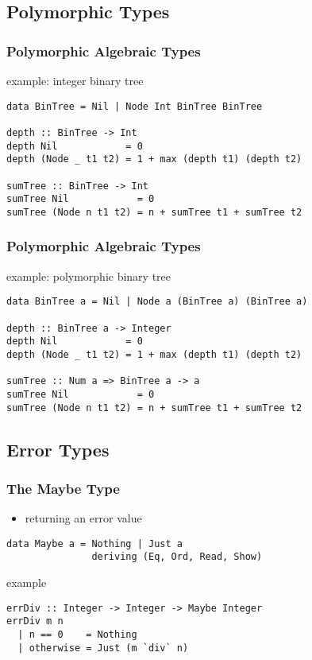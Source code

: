 \documentclass[dvipsnames]{beamer}
\theoremstyle{plain}
\begin{document}
\subsection{Polymorphic Types}

\begin{frame}[fragile]
  \frametitle{Polymorphic Algebraic Types}

  \begin{exampleblock}{example: integer binary tree}
    \begin{lstlisting}
data BinTree = Nil | Node Int BinTree BinTree

depth :: BinTree -> Int
depth Nil            = 0
depth (Node _ t1 t2) = 1 + max (depth t1) (depth t2)

sumTree :: BinTree -> Int
sumTree Nil            = 0
sumTree (Node n t1 t2) = n + sumTree t1 + sumTree t2
    \end{lstlisting}
  \end{exampleblock}
\end{frame}

\begin{frame}[fragile]
  \frametitle{Polymorphic Algebraic Types}

  \begin{exampleblock}{example: polymorphic binary tree}
    \begin{lstlisting}
data BinTree a = Nil | Node a (BinTree a) (BinTree a)

depth :: BinTree a -> Integer
depth Nil            = 0
depth (Node _ t1 t2) = 1 + max (depth t1) (depth t2)

sumTree :: Num a => BinTree a -> a
sumTree Nil            = 0
sumTree (Node n t1 t2) = n + sumTree t1 + sumTree t2
    \end{lstlisting}
  \end{exampleblock}
\end{frame}

\subsection{Error Types}

\begin{frame}[fragile]
  \frametitle{The Maybe Type}

  \begin{itemize}
    \item returning an error value
  \end{itemize}

  \begin{lstlisting}
data Maybe a = Nothing | Just a
               deriving (Eq, Ord, Read, Show)
  \end{lstlisting}

  \begin{exampleblock}{example}
    \begin{lstlisting}
errDiv :: Integer -> Integer -> Maybe Integer
errDiv m n
  | n == 0    = Nothing
  | otherwise = Just (m `div` n)
    \end{lstlisting}
  \end{exampleblock}
\end{frame}
\end{document}
